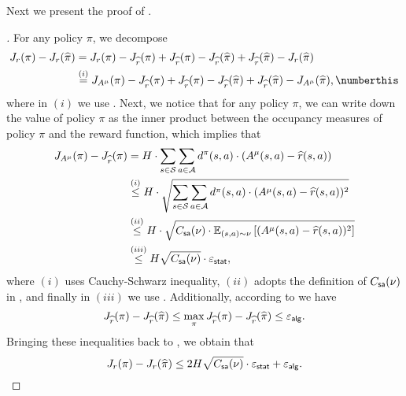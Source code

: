 \documentclass{article}
\begin{document}
Next we present the proof of .
\begin{proof}[]
    For any policy $\pi$, we decompose
    \begin{align*}
        J_r(\pi) - J_r(\hpi) & = J_r(\pi) - J_{\hr}(\pi) + J_{\hr}(\pi) - J_{\hr}(\hpi) + J_{\hr}(\hpi) - J_r(\hpi)\\
        & \stackrel{(i)}{=} J_{A^{\mu}}(\pi) - J_{\hr}(\pi) + J_{\hr}(\pi) - J_{\hr}(\hpi) + J_{\hr}(\hpi) - J_{A^\mu}(\hpi), \numberthis \label{eq: J-pi-hpi}
    \end{align*}
    where in $(i)$ we use . Next, we notice that for any policy $\pi$, we can write down the value of policy $\pi$ as the inner product between the occupancy measures of policy $\pi$ and the reward function, which implies that
    \begin{align*} 
        J_{A^\mu}(\pi) - J_{\widehat{r}}(\pi) & = H\cdot \sum_{s\in \mathcal{S}}\sum_{a\in \mathcal{A}} d^\pi(s, a)\cdot (A^\mu(s, a) - \widehat{r}(s, a))\\
        & \stackrel{(i)}{\le } H\cdot \sqrt{\sum_{s\in \mathcal{S}}\sum_{a\in \mathcal{A}} d^\pi(s, a)\cdot (A^\mu(s, a) - \widehat{r}(s, a))^2}\\
        & \stackrel{(ii)}{\le } H\cdot \sqrt{C_{\mathsf{sa}}(\nu)\cdot \mathbb{E}_{(s, a)\sim \nu} \left[(A^\mu(s, a) - \widehat{r}(s, a))^2\right]}\\
        & \stackrel{(iii)}{\le } H\sqrt{C_{\mathsf{sa}}(\nu)}\cdot \varepsilon_{\sf stat},
    \end{align*}
    where $(i)$ uses Cauchy-Schwarz inequality, $(ii)$ adopts the definition of $C_{\mathsf{sa}}(\nu)$ in , and finally in $(iii)$ we use . Additionally, according to  we have 
    $$J_{\widehat{r}}(\pi) - J_{\widehat{r}}(\widehat{\pi})\le \max_{\pi} J_{\widehat{r}}(\pi) - J_{\widehat{r}}(\widehat{\pi})\le \varepsilon_{\sf alg}.$$
    Bringing these inequalities back to , we obtain that 
    $$J_r(\pi) - J_r(\widehat{\pi})\le 2H\sqrt{C_{\mathsf{sa}}(\nu)}\cdot \varepsilon_{\sf stat} + \varepsilon_{\sf alg}.$$
\end{proof}
\end{document}
